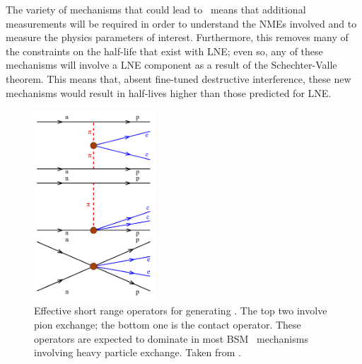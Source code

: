 \documentclass[/main.tex]{subfiles}
\begin{document}
The variety of mechanisms that could lead to \znbb\ means that additional measurements will be required in order to understand the NMEs involved and to measure the physics parameters of interest.
Furthermore, this removes many of the constraints on the half-life that exist with LNE; even so, any of these mechanisms will involve a LNE component as a result of the Schechter-Valle theorem.
This means that, absent fine-tuned destructive interference, these new mechanisms would result in half-lives higher than those predicted for LNE.
\begin{figure}[t]
  \centering
  \includegraphics[width=0.4\textwidth]{znbbshortrange}
  \caption[Effective Pion Exchange Operators for \znbb]{\label{fig:znbbeffpion}
    Effective short range operators for generating \znbb. The top two involve pion exchange; the bottom one is the contact operator. These operators are expected to dominate in most BSM \znbb\ mechanisms involving heavy particle exchange. Taken from \cite{Engel2017}.
  }
\end{figure}
\end{document}
